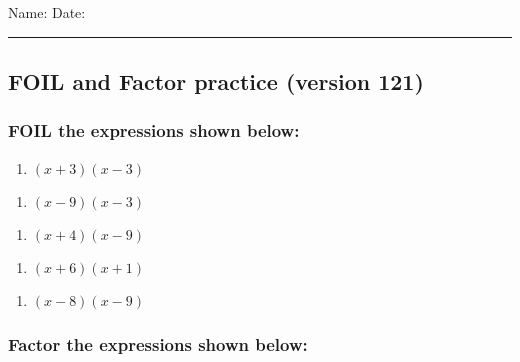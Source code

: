 \documentclass[
]{article}
\author{}
\date{\vspace{-2.5em}}
\providecommand{\tightlist}{%
  \setlength{\itemsep}{0pt}\setlength{\parskip}{0pt}}
\begin{document}
Name: \hspace{4in} Date: \hfill \vspace{3pt}

\hrule

\hypertarget{foil-and-factor-practice-version-121}{%
\subsection{FOIL and Factor practice (version
121)}\label{foil-and-factor-practice-version-121}}

\hypertarget{foil-the-expressions-shown-below}{%
\subsubsection{FOIL the expressions shown
below:}\label{foil-the-expressions-shown-below}}

\begin{enumerate}
\def\labelenumi{\arabic{enumi}.}
\tightlist
\item
  \((x+3)(x-3)\)
\end{enumerate}

\vfill

\begin{enumerate}
\def\labelenumi{\arabic{enumi}.}
\setcounter{enumi}{1}
\tightlist
\item
  \((x-9)(x-3)\)
\end{enumerate}

\vfill

\begin{enumerate}
\def\labelenumi{\arabic{enumi}.}
\setcounter{enumi}{2}
\tightlist
\item
  \((x+4)(x-9)\)
\end{enumerate}

\vfill

\begin{enumerate}
\def\labelenumi{\arabic{enumi}.}
\setcounter{enumi}{3}
\tightlist
\item
  \((x+6)(x+1)\)
\end{enumerate}

\vfill

\begin{enumerate}
\def\labelenumi{\arabic{enumi}.}
\setcounter{enumi}{4}
\tightlist
\item
  \((x-8)(x-9)\)
\end{enumerate}

\vfill

\newpage

\hypertarget{factor-the-expressions-shown-below}{%
\subsubsection{Factor the expressions shown
below:}\label{factor-the-expressions-shown-below}}
\end{document}
